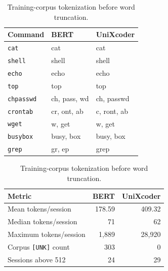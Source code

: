 \begin{table}[tbp]
    \begin{minipage}[t]{0.49\linewidth}
        \centering
        \small
        \begin{tabular}{lll}
            \toprule
            \textbf{Command} & \textbf{BERT} & \textbf{UniXcoder} \\
            \midrule
            \texttt{cat}      & cat          & cat \\
            \texttt{shell}    & shell        & shell \\
            \texttt{echo}     & echo         & echo \\
            \texttt{top}      & top          & top \\
            \texttt{chpasswd} & ch, pass, wd & ch, passwd \\
            \texttt{crontab}  & cr, ont, ab  & c, ront, ab \\
            \texttt{wget}     & w, get       & w, get \\
            \texttt{busybox}  & busy, box    & busy, box \\
            \texttt{grep}     & gr, ep       & grep \\
            \bottomrule
        \end{tabular}
        \vspace{0.1cm}
        \caption{Subword tokenization of the SSH commands.}
        \label{tab:task2_commands}
    \end{minipage}
    \hfill
    \begin{minipage}[t]{0.49\linewidth}
        \centering
        \small
        \begin{tabular}{lrr}
            \toprule
            \textbf{Metric} & \textbf{BERT} & \textbf{UniXcoder} \\
            \midrule
            Mean tokens/session       & 178.59 & 409.32 \\
            Median tokens/session     & 71     & 62 \\
            Maximum tokens/session    & 1,889  & 28,920 \\
            Corpus \texttt{[UNK]} count & 303    & 0 \\
            Sessions above 512        & 24     & 29 \\
            \bottomrule
        \end{tabular}
        \vspace{0.1cm}
        \caption{Training-corpus tokenization before word truncation.}
        \label{tab:task2_raw_stats}
    \end{minipage}
\end{table}

